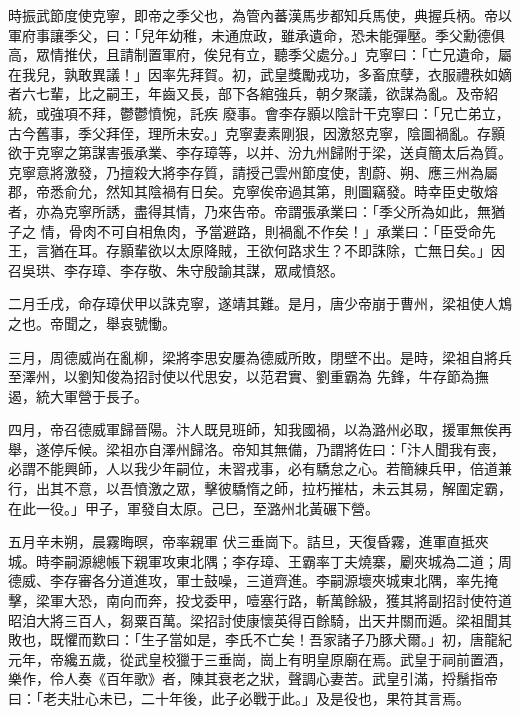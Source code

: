\begin{pinyinscope}
 時振武節度使克寧，即帝之季父也，為管內蕃漢馬步都知兵馬使，典握兵柄。帝以軍府事讓季父，曰：「兒年幼稚，未通庶政，雖承遺命，恐未能彈壓。季父勳德俱高，眾情推伏，且請制置軍府，俟兒有立，聽季父處分。」克寧曰：「亡兄遺命，屬在我兒，孰敢異議！」因率先拜賀。初，武皇獎勵戎功，多畜庶孽，衣服禮秩如嫡者六七輩，比之嗣王，年齒又長，部下各綰強兵，朝夕聚議，欲謀為亂。及帝紹統，或強項不拜，鬱鬱憤惋，託疾
 廢事。會李存顥以陰計干克寧曰：「兄亡弟立，古今舊事，季父拜侄，理所未安。」克寧妻素剛狠，因激怒克寧，陰圖禍亂。存顥欲于克寧之第謀害張承業、李存璋等，以并、汾九州歸附于梁，送貞簡太后為質。克寧意將激發，乃擅殺大將李存質，請授己雲州節度使，割蔚、朔、應三州為屬郡，帝悉俞允，然知其陰禍有日矣。克寧俟帝過其第，則圖竊發。時幸臣史敬熔者，亦為克寧所誘，盡得其情，乃來告帝。帝謂張承業曰：「季父所為如此，無猶子之
 情，骨肉不可自相魚肉，予當避路，則禍亂不作矣！」承業曰：「臣受命先王，言猶在耳。存顥輩欲以太原降賊，王欲何路求生？不即誅除，亡無日矣。」因召吳珙、李存璋、李存敬、朱守殷諭其謀，眾咸憤怒。



 二月壬戌，命存璋伏甲以誅克寧，遂靖其難。是月，唐少帝崩于曹州，梁祖使人鴆之也。帝聞之，舉哀號慟。



 三月，周德威尚在亂柳，梁將李思安屢為德威所敗，閉壁不出。是時，梁祖自將兵至澤州，以劉知俊為招討使以代思安，以范君實、劉重霸為
 先鋒，牛存節為撫遏，統大軍營于長子。



 四月，帝召德威軍歸晉陽。汴人既見班師，知我國禍，以為潞州必取，援軍無俟再舉，遂停斥候。梁祖亦自澤州歸洛。帝知其無備，乃謂將佐曰：「汴人聞我有喪，必謂不能興師，人以我少年嗣位，未習戎事，必有驕怠之心。若簡練兵甲，倍道兼行，出其不意，以吾憤激之眾，擊彼驕惰之師，拉朽摧枯，未云其易，解圍定霸，在此一役。」甲子，軍發自太原。己巳，至潞州北黃碾下營。



 五月辛未朔，晨霧晦暝，帝率親軍
 伏三垂崗下。詰旦，天復昏霧，進軍直抵夾城。時李嗣源總帳下親軍攻東北隅；李存璋、王霸率丁夫燒寨，劚夾城為二道；周德威、李存審各分道進攻，軍士鼓噪，三道齊進。李嗣源壞夾城東北隅，率先掩擊，梁軍大恐，南向而奔，投戈委甲，噎塞行路，斬萬餘級，獲其將副招討使符道昭洎大將三百人，芻粟百萬。梁招討使康懷英得百餘騎，出天井關而遁。梁祖聞其敗也，既懼而歎曰：「生子當如是，李氏不亡矣！吾家諸子乃豚犬爾。」初，唐龍紀
 元年，帝纔五歲，從武皇校獵于三垂崗，崗上有明皇原廟在焉。武皇于祠前置酒，樂作，伶人奏《百年歌》者，陳其衰老之狀，聲調心妻苦。武皇引滿，捋鬚指帝曰：「老夫壯心未已，二十年後，此子必戰于此。」及是役也，果符其言焉。




\end{pinyinscope}
